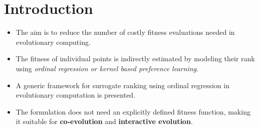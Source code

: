 
\section{Introduction}

\begin{itemize}
\item The aim is to reduce the number of costly fitness
  evaluations needed in evolutionary computing.
\item The fitness of individual points is indirectly estimated
  by modeling their rank using \emph{ordinal regression or kernel
  based preference learning}.
\item A generic framework for surrogate ranking using ordinal
regression in evolutionary computation is presented. 
\item The formulation does not need an explicitly defined
  fitness function, making it suitable for {\bf co-evolution} and
  {\bf interactive evolution}.
\end{itemize}

\ \\